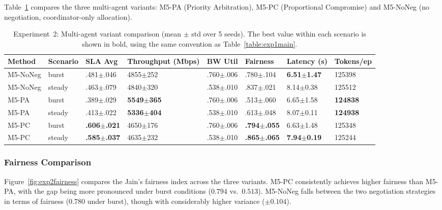 Table~\ref{table:exp2} compares the three multi-agent variants: M5-PA (Priority Arbitration), M5-PC (Proportional Compromise) and M5-NoNeg (no negotiation, coordinator-only allocation).

\begin{table}[h]
  \centering
  \begin{spacing}{1.2}
  \caption{Experiment~2: Multi-agent variant comparison (mean $\pm$ std over 5 seeds). The best value within each scenario is shown in bold, using the same convention as Table~\ref{table:exp1main}.}\vspace{0.7em}
  \label{table:exp2}
  \footnotesize
    \begin{tabular}{|p{1.8cm}|p{1.2cm}|p{1.5cm}|p{1.6cm}|p{1.5cm}|p{1.5cm}|p{1.5cm}|p{1.6cm}|}
    \hline
    \textbf{Method} & \textbf{Scenario} & \textbf{SLA Avg} & \textbf{Throughput (Mbps)} & \textbf{BW Util} & \textbf{Fairness} & \textbf{Latency (s)} & \textbf{Tokens/ep} \\
    \hline
    M5-NoNeg & burst & .481$\pm$.046 & 4855$\pm$252 & .760$\pm$.006 & .780$\pm$.104 & \textbf{6.51$\pm$1.47} & 125398 \\
    \hline
    M5-NoNeg & steady & .463$\pm$.079 & 4840$\pm$320 & .538$\pm$.010 & .837$\pm$.021 & 8.14$\pm$0.38 & 125512 \\
    \hline
    M5-PA & burst & .389$\pm$.029 & \textbf{5549$\pm$365} & .760$\pm$.006 & .513$\pm$.060 & 6.65$\pm$1.58 & \textbf{124838} \\
    \hline
    M5-PA & steady & .413$\pm$.022 & \textbf{5336$\pm$404} & .538$\pm$.010 & .613$\pm$.048 & 8.07$\pm$0.11 & \textbf{124938} \\
    \hline
    M5-PC & burst & \textbf{.606$\pm$.021} & 4650$\pm$176 & .760$\pm$.006 & \textbf{.794$\pm$.055} & 6.63$\pm$1.48 & 125348 \\
    \hline
    M5-PC & steady & \textbf{.585$\pm$.037} & 4635$\pm$232 & .538$\pm$.010 & \textbf{.865$\pm$.065} & \textbf{7.94$\pm$0.19} & 125244 \\
    \hline
    \end{tabular}
  \end{spacing}
\end{table}

\subsubsection{Fairness Comparison}

Figure~\ref{fig:exp2fairness} compares the Jain's fairness index across the three variants. M5-PC consistently achieves higher fairness than M5-PA, with the gap being more pronounced under burst conditions ($0.794$ vs.\ $0.513$). M5-NoNeg falls between the two negotiation strategies in terms of fairness ($0.780$ under burst), though with considerably higher variance ($\pm 0.104$).

